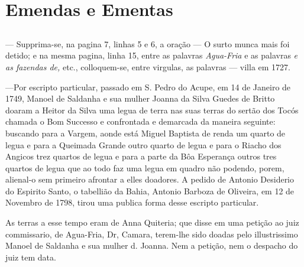 \chapter{Emendas e Ementas}
\section*{}
— Supprima-se, na pagina 7, linhas 5 e 6, a oração — O surto munca mais foi detido; e na mesma pagina, linha 15, entre as palavras \textit{Agua-Fria} e as palavras \textit{e as fazendas de,} etc., colloquem-se, entre virgulas, as palavras — villa em 1727.

—Por escripto particular, passado em S. Pedro do Acupe, em 14 de Janeiro de 1749, Manoel de Saldanha e sua mulher Joanna da Silva Guedes de Britto doaram a Heitor da Silva uma legua de terra nas suas terras do sertão dos Tocós chamada o Bom Successo e confrontada e demarcada da maneira seguinte:
buscando para a Vargem, aonde está Miguel Baptista de renda um quarto de legua e para a Queimada Grande outro quarto de legua e para o Riacho dos Angicos trez quartos de legua e para a parte da Bôa Esperança outros tres
quartos de legua que ao todo faz uma legua em quadro não podendo, porem, alienal-o sem primeiro afrontar a elles doadores. A pedido de Antonio Desiderio do Espirito Santo, o tabellião da Bahia, Antonio Barboza de Oliveira, em 12 de Novembro de 1798, tirou uma publica forma desse escripto particular.

As terras a esse tempo eram de Anna Quiteria; que disse em uma petição ao juiz commissario, de Agua-Fria, Dr, Camara, terem-lhe sido doadas pelo illustrissimo Manoel de Saldanha e sua mulher d. Joanna. Nem a petição, nem o despacho do juiz tem data.

